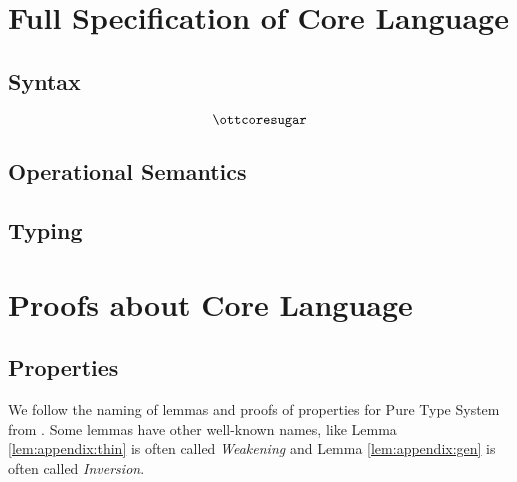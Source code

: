 \section{Full Specification of Core Language}

\subsection{Syntax}
\gram{\otte\ottinterrule
        \ottG\ottinterrule
        \ottv}
\[\ottcoresugar\] %

\subsection{Operational Semantics}
\ottdefnstep{}
\ottusedrule{\ottdruleSXXMu{}}

\subsection{Typing}
\ottdefnctx{}\ottinterrule
\ottdefnexpr{}
\ottusedrule{\ottdruleTXXMu{}}

\section{Proofs about Core Language}
\subsection{Properties}
We follow the naming of lemmas and proofs of properties 
for Pure Type System from \cite{handbook}. Some lemmas have other well-known names, like
Lemma \ref{lem:appendix:thin} is often called \emph{Weakening} and 
Lemma \ref{lem:appendix:gen} is often called \emph{Inversion}.


